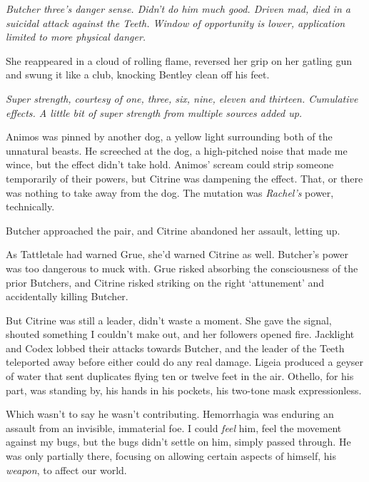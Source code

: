 \emph{Butcher three's danger sense.  Didn't do him much good.  Driven mad, died in a suicidal attack against the Teeth.  Window of opportunity is lower, application limited to more physical danger.}



She reappeared in a cloud of rolling flame, reversed her grip on her gatling gun and swung it like a club, knocking Bentley clean off his feet.



\emph{Super strength, courtesy of one, three, six, nine, eleven and thirteen.  Cumulative effects.  A little bit of super strength from multiple sources added up.}



Animos was pinned by another dog, a yellow light surrounding both of the unnatural beasts.  He screeched at the dog, a high-pitched noise that made me wince, but the effect didn't take hold.  Animos' scream could strip someone temporarily of their powers, but Citrine was dampening the effect.  That, or there was nothing to take away from the dog.  The mutation was \emph{Rachel's} power, technically.



Butcher approached the pair, and Citrine abandoned her assault, letting up.



As Tattletale had warned Grue, she'd warned Citrine as well. Butcher's power was too dangerous to muck with.  Grue risked absorbing the consciousness of the prior Butchers, and Citrine risked striking on the right `attunement' and accidentally killing Butcher.



But Citrine was still a leader, didn't waste a moment.  She gave the signal, shouted something I couldn't make out, and her followers opened fire.  Jacklight and Codex lobbed their attacks towards Butcher, and the leader of the Teeth teleported away before either could do any real damage.  Ligeia produced a geyser of water that sent duplicates flying ten or twelve feet in the air.  Othello, for his part, was standing by, his hands in his pockets, his two-tone mask expressionless.



Which wasn't to say he wasn't contributing.  Hemorrhagia was enduring an assault from an invisible, immaterial foe.  I could \emph{feel} him, feel the movement against my bugs, but the bugs didn't settle on him, simply passed through.  He was only partially there, focusing on allowing certain aspects of himself, his \emph{weapon}, to affect our world.



